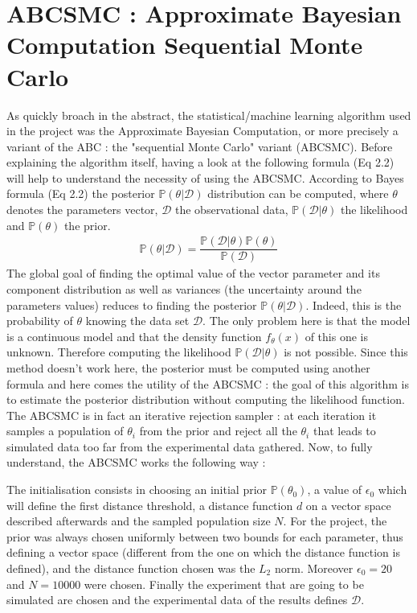 \documentclass[11pt]{report}
\begin{document}
\section{ABCSMC : Approximate Bayesian Computation Sequential Monte Carlo}

As quickly broach in the abstract, the statistical/machine learning algorithm used in the project was the Approximate Bayesian Computation, or more precisely a variant of the ABC : the "sequential Monte Carlo" variant (ABCSMC). Before explaining the algorithm itself, having a look at the following formula (Eq 2.2) will help to understand the necessity of using the ABCSMC. According to Bayes formula (Eq 2.2) the posterior $\mathbb{P}(\theta | \mathcal{D})$ distribution can be computed, where $\theta$ denotes the parameters vector, $\mathcal{D}$ the observational data, $\mathbb{P}(\mathcal{D} | \theta)$ the likelihood and $\mathbb{P}(\theta) $ the prior.
\begin{eqnarray}
\mathbb{P}(\theta | \mathcal{D}) = \dfrac{\mathbb{P}(\mathcal{D} | \theta) \mathbb{P}(\theta) }{\mathbb{P}(\mathcal{D})} 
\end{eqnarray}
The global goal of finding the optimal value of the vector parameter and its component distribution as well as variances (the uncertainty around the parameters values) reduces to finding the posterior $\mathbb{P}(\theta | \mathcal{D})$. Indeed, this is the probability of $\theta$ knowing the data set $\mathcal{D}$. The only problem here is that the model is a continuous model and that the density function $f_{\theta}(x)$ of this one is unknown. Therefore computing the likelihood $\mathbb{P}(\mathcal{D} | \theta)$ is not possible. Since this method doesn't work here, the posterior must be computed using another formula and here comes the utility of the ABCSMC : the goal of this algorithm is to estimate the posterior distribution without computing the likelihood function. The ABCSMC is in fact an iterative rejection sampler : at each iteration it samples a population of $\theta_i$ from the prior and reject all the $\theta_i$ that leads to simulated data too far from the experimental data gathered. Now, to fully understand, the ABCSMC works the following way : 

The initialisation consists in choosing an initial prior $\mathbb{P}(\theta_{0})$, a value of $\epsilon_{0}$ which will define the first distance threshold, a distance function $d$ on a vector space described afterwards and the sampled population size $N$. For the project, the prior was always chosen uniformly between two bounds for each parameter, thus defining a vector space (different from the one on which the distance function is defined), and the distance function chosen was the $L_2$ norm. 
Moreover $\epsilon_{0}=20$ and $N = 10 000$ were chosen. Finally the experiment that are going to be simulated are chosen and the experimental data of the results defines $\mathcal{D}$.
\end{document}
